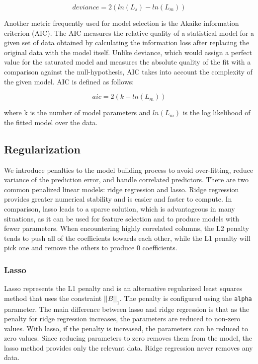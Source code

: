 \documentclass[11pt]{article}
\begin{document}
\[ deviance = 2({ln(L_{s})} - {ln(L_{m})}) \]

Another metric frequently used for model selection is the Akaike information criterion (AIC). The AIC measures the relative quality of a statistical model for a given set of data obtained by calculating the information loss after replacing the original data with the model itself. Unlike deviance, which would assign a perfect value for the saturated model and measures the absolute quality of the fit with a comparison against the null-hypothesis, AIC takes into account the complexity of the given model. AIC is defined as follows:

\[ aic = 2(k - ln(L_{m}))\]

where k is the number of model parameters and $ln(L_{m})$ is the log likelihood of the fitted model over the data.


\subsection{Regularization} 
We introduce penalties to the model building process to avoid over-fitting, reduce variance of the prediction error, and handle correlated predictors. There are two common penalized linear models: ridge regression and lasso. Ridge regression provides greater numerical stability and is easier and faster to compute. In comparison, lasso leads to a sparse solution, which is advantageous in many situations, as it can be used for feature selection and to produce models with fewer parameters. When encountering highly correlated columns, the L2 penalty tends to push all of the coefficients towards each other, while the L1 penalty will pick one and remove the others to produce 0 coefficients.

\subsubsection{Lasso}

Lasso represents the L1 penalty and is an alternative regularized least squares method that uses the constraint $||B||_1$. The penalty is configured using the \texttt{alpha} parameter. The main difference between lasso and ridge regression is that as the penalty for ridge regression increases, the parameters are reduced to non-zero values. With lasso, if the penalty is increased, the parameters can be reduced to zero values. Since reducing parameters to zero removes them from the model, the lasso method provides only the relevant data. Ridge regression never removes any data. 
\end{document}
